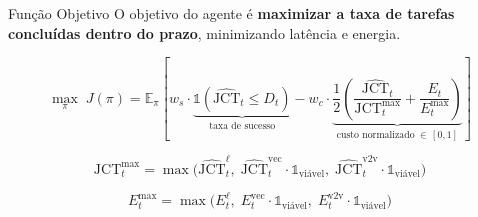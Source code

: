 \documentclass{beamer}
\begin{document}
\begin{frame}{Função Objetivo}
    \footnotesize
    O objetivo do agente é \textbf{maximizar a taxa de tarefas concluídas dentro do prazo}, minimizando latência e energia.
        
    \begin{equation}
        \max_{\pi}\; J(\pi) = \mathbb{E}_{\pi}\!\left[ w_s \cdot \underbrace{\mathbb{1}(\widehat{\text{JCT}}_t \leq D_t)}_{\text{taxa de sucesso}} - w_c \cdot \underbrace{\frac{1}{2}\!\left(\frac{\widehat{\text{JCT}}_t}{\text{JCT}^{\max}_t} + \frac{E_t}{E^{\max}_t}\right)}_{\text{custo normalizado}\;\in\,[0, 1]} \right]
        \label{eq:obj_geral}
    \end{equation}

    \begin{equation}
        \text{JCT}^{\max}_t = \max\!\bigl(\widehat{\text{JCT}}^{\ell}_t,\; \widehat{\text{JCT}}^{\text{vec}}_t \cdot \mathbb{1}_{\text{viável}},\; \widehat{\text{JCT}}^{\text{v2v}}_t \cdot \mathbb{1}_{\text{viável}}\bigr)
        \label{eq:jct_max}
    \end{equation}

    \begin{equation}
        E^{\text{max}}_t = \max\!\bigl(E^{\ell}_t,\; E^{\text{vec}}_t \cdot \mathbb{1}_{\text{viável}},\; E^{\text{v2v}}_t \cdot \mathbb{1}_{\text{viável}}\bigr)
        \label{eq:e_max}
    \end{equation}

\end{frame}



        
\end{document}
